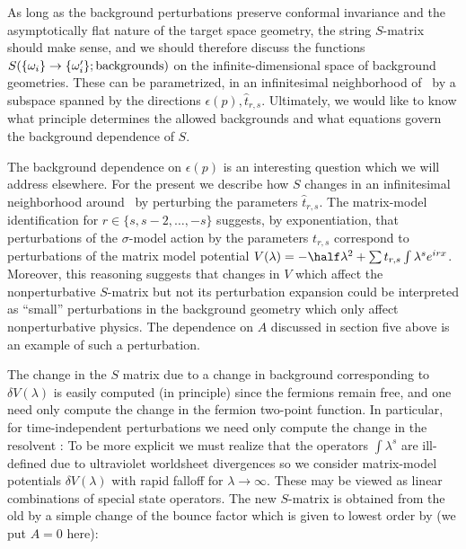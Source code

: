 As long as the background perturbations preserve conformal invariance and 
the asymptotically flat nature of the target space geometry, the string 
$S$-matrix should make sense, and we should therefore discuss the 
functions 
$S(\{\omega_i\} \to \{\omega_i'\};{\rm backgrounds})$ 
on the infinite-dimensional space of background geometries.
These can be parametrized, in an infinitesimal neighborhood
of \confld\ by a subspace spanned by the directions 
$\epsilon(p), \hat t_{r,s}$. Ultimately, we would 
like to know what principle determines the allowed backgrounds 
and what equations govern the background dependence of $S$.
 
The background dependence on $\epsilon(p)$ is an interesting 
question which we will address elsewhere.
For the present we describe how $S$ changes in an 
infinitesimal neighborhood around \confld\ by perturbing
the parameters $\hat t_{r,s}$. The matrix-model
identification 
\eqn{}
for $r\in\{s,s-2,\dots,-s\}$ suggests, by exponentiation, that
perturbations of the $\sigma$-model action by the parameters
$t_{r,s}$ correspond to perturbations of the matrix model
potential
$V(\lambda)=-\half \lambda^2+\sum {t}_{r,s}\int 
\lambda^s e^{irx}$.%
Moreover, this reasoning suggests that changes in $V$ which 
affect the nonperturbative $S$-matrix but not its perturbation
expansion could be interpreted as ``small'' perturbations in the 
background geometry which only affect nonperturbative physics. 
The dependence on $A$ discussed in section five above is an example
of such a perturbation.
 
The change in the $S$ matrix due to a change in background 
corresponding to $\delta V(\lambda)$ is easily computed (in principle)
since the fermions remain free, and one need only compute
the change in the fermion two-point function. In particular,
for time-independent perturbations we need only 
compute the change in the resolvent \prev:
\eqn{}
To be more explicit we must realize that the operators 
$\int \lambda^s$ are ill-defined due to ultraviolet 
worldsheet divergences 
so we consider matrix-model 
potentials $\delta V(\lambda)$ with rapid falloff for 
$\lambda\to \infty$. These may be viewed as linear
combinations of special state operators.
The new $S$-matrix is obtained from 
the old by a simple change of the bounce factor which is given 
to lowest order by (we put $A=0$ here):
\eqn{}
 
